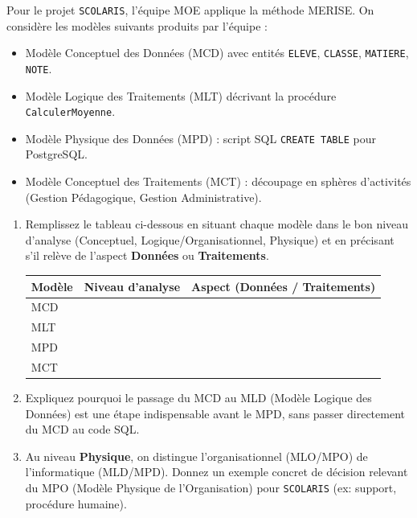 \documentclass[11pt]{article}
\begin{document}
\begin{exercice}
Pour le projet \texttt{SCOLARIS}, l'équipe MOE applique la méthode MERISE. On considère les modèles suivants produits par l'équipe :
\begin{itemize}
    \item Modèle Conceptuel des Données (MCD) avec entités \texttt{ELEVE}, \texttt{CLASSE}, \texttt{MATIERE}, \texttt{NOTE}.
    \item Modèle Logique des Traitements (MLT) décrivant la procédure \texttt{CalculerMoyenne}.
    \item Modèle Physique des Données (MPD) : script SQL \texttt{CREATE TABLE} pour PostgreSQL.
    \item Modèle Conceptuel des Traitements (MCT) : découpage en sphères d'activités (Gestion Pédagogique, Gestion Administrative).
\end{itemize}
\begin{enumerate}
    \item Remplissez le tableau ci-dessous en situant chaque modèle dans le bon niveau d'analyse (Conceptuel, Logique/Organisationnel, Physique) et en précisant s'il relève de l'aspect \textbf{Données} ou \textbf{Traitements}.

    \begin{tabular}{|l|c|c|}
    \hline
    \textbf{Modèle} & \textbf{Niveau d'analyse} & \textbf{Aspect (Données / Traitements)} \\
    \hline
    MCD & & \\
    \hline
    MLT & & \\
    \hline
    MPD & & \\
    \hline
    MCT & & \\
    \hline
    \end{tabular}

    \item Expliquez pourquoi le passage du MCD au MLD (Modèle Logique des Données) est une étape indispensable avant le MPD, sans passer directement du MCD au code SQL.
    \item Au niveau \textbf{Physique}, on distingue l'organisationnel (MLO/MPO) de l'informatique (MLD/MPD). Donnez un exemple concret de décision relevant du MPO (Modèle Physique de l'Organisation) pour \texttt{SCOLARIS} (ex: support, procédure humaine).
\end{enumerate}
\end{exercice}
\end{document}
